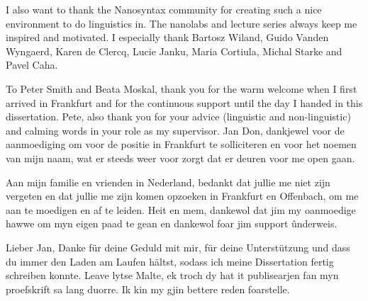 I also want to thank the Nanosyntax community for creating such a nice environment to do linguistics in.
The nanolabs and lecture series always keep me inspired and motivated.
I especially thank
Bartosz Wiland,
Guido Vanden Wyngaerd,
Karen de Clercq,
Lucie Janku,
Maria Cortiula,
Michal Starke and
Pavel Caha.

To Peter Smith and Beata Moskal,
thank you for the warm welcome when I first arrived in Frankfurt and for the continuous support until the day I handed in this dissertation.
Pete, also thank you for your advice (linguistic and non-linguistic) and calming words in your role as my supervisor. Jan Don, dankjewel voor de aanmoediging om voor de positie in Frankfurt te solliciteren en voor het noemen van mijn naam, wat er steeds weer voor zorgt dat er deuren voor me open gaan.

Aan mijn familie en vrienden in Nederland, bedankt dat jullie me niet zijn vergeten en dat jullie me zijn komen opzoeken in Frankfurt en Offenbach, om me aan te moedigen en af te leiden.
Heit en mem, dankewol dat jim my oanmoedige hawwe om myn eigen paad te gean en dankewol foar jim support ûnderweis.

Lieber Jan, Danke für deine Geduld mit mir, für deine Unterstützung und dass du immer den Laden am Laufen hältst, sodass ich meine Dissertation fertig schreiben konnte.
Leave lytse Malte, ek troch dy hat it publisearjen fan myn proefskrift sa lang duorre. Ik kin my gjin bettere reden foarstelle.

